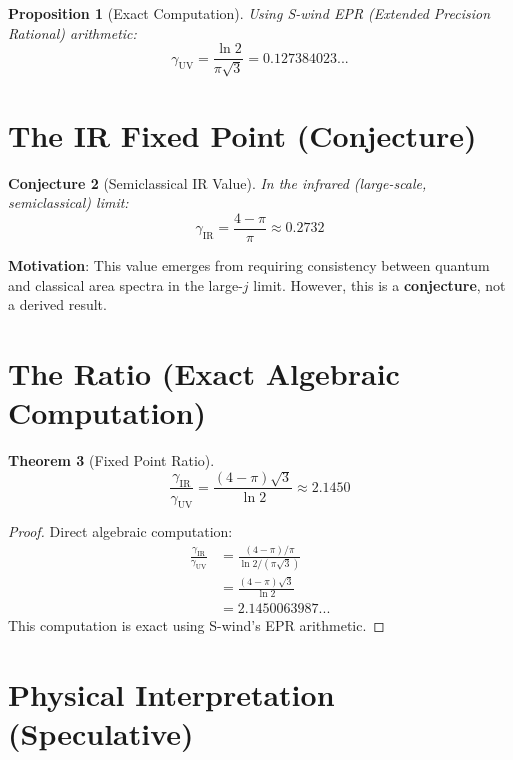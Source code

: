 \documentclass[11pt,a4paper]{article}
\theoremstyle{plain}
\newtheorem{theorem}{Theorem}[section]
\newtheorem{proposition}[theorem]{Proposition}
\newtheorem{conjecture}[theorem]{Conjecture}
\begin{document}
\begin{proposition}[Exact Computation]
Using S-wind EPR (Extended Precision Rational) arithmetic:
\begin{equation}
\gamma_{\text{UV}} = \frac{\ln 2}{\pi\sqrt{3}} = 0.127384023...
\end{equation}
\end{proposition}

\section{The IR Fixed Point (Conjecture)}

\begin{conjecture}[Semiclassical IR Value]
In the infrared (large-scale, semiclassical) limit:
\begin{equation}
\gamma_{\text{IR}} = \frac{4-\pi}{\pi} \approx 0.2732
\end{equation}
\end{conjecture}

\textbf{Motivation}: This value emerges from requiring consistency between quantum and classical area spectra in the large-$j$ limit. However, this is a \textbf{conjecture}, not a derived result.

\section{The Ratio (Exact Algebraic Computation)}

\begin{theorem}[Fixed Point Ratio]
\begin{equation}
\frac{\gamma_{\text{IR}}}{\gamma_{\text{UV}}} = \frac{(4-\pi)\sqrt{3}}{\ln 2} \approx 2.1450
\end{equation}
\end{theorem}

\begin{proof}
Direct algebraic computation:
\begin{align}
\frac{\gamma_{\text{IR}}}{\gamma_{\text{UV}}} &= \frac{(4-\pi)/\pi}{\ln 2/(\pi\sqrt{3})} \\
&= \frac{(4-\pi)\sqrt{3}}{\ln 2} \\
&= 2.1450063987...
\end{align}
This computation is exact using S-wind's EPR arithmetic.
\end{proof}

\section{Physical Interpretation (Speculative)}
\end{document}
